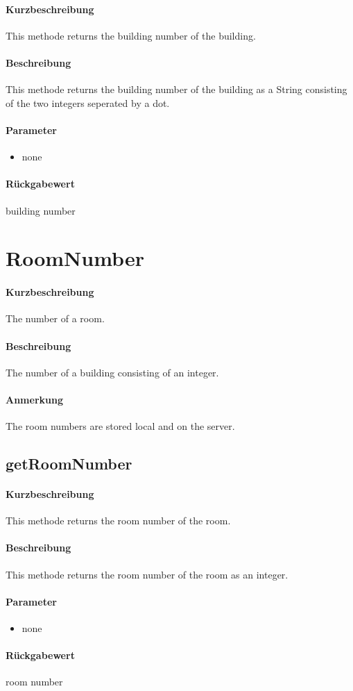 \paragraph*{Kurzbeschreibung}
This methode returns the building number of the building.
\paragraph*{Beschreibung}
This methode returns the building number of the building as a String consisting of the two integers seperated by a dot.
\paragraph*{Parameter}
\begin{itemize}
    \item none
\end{itemize}
\paragraph*{Rückgabewert}
building number


\section{RoomNumber}
\paragraph*{Kurzbeschreibung}
The number of a room.
\paragraph*{Beschreibung}
The number of a building consisting of an integer.
\paragraph*{Anmerkung}
The room numbers are stored local and on the server.

\subsection{getRoomNumber}%
\paragraph*{Kurzbeschreibung}
This methode returns the room number of the room.
\paragraph*{Beschreibung}
This methode returns the room number of the room as an integer.
\paragraph*{Parameter}
\begin{itemize}
    \item none
\end{itemize}
\paragraph*{Rückgabewert}
room number